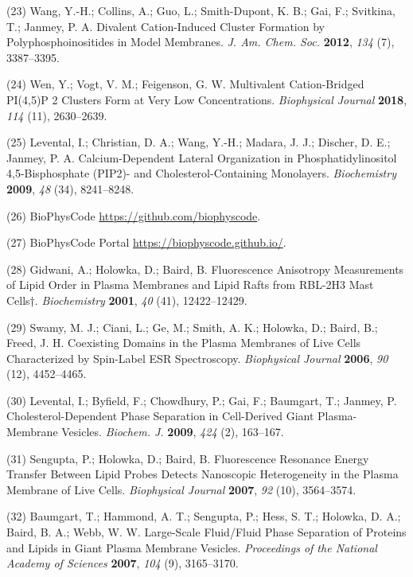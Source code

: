 \documentclass[11pt,notitlepage]{article}
\begin{document}
\leavevmode\hypertarget{ref-LhOwGz4k}{}%
(23) Wang, Y.-H.; Collins, A.; Guo, L.; Smith-Dupont, K. B.; Gai, F.;
Svitkina, T.; Janmey, P. A. Divalent Cation-Induced Cluster Formation by
Polyphosphoinositides in Model Membranes. \emph{J. Am. Chem. Soc.}
\textbf{2012}, \emph{134} (7), 3387--3395.

\leavevmode\hypertarget{ref-ior8wlwH}{}%
(24) Wen, Y.; Vogt, V. M.; Feigenson, G. W. Multivalent Cation-Bridged
PI(4,5)P 2 Clusters Form at Very Low Concentrations. \emph{Biophysical
Journal} \textbf{2018}, \emph{114} (11), 2630--2639.

\leavevmode\hypertarget{ref-JWXdIfNt}{}%
(25) Levental, I.; Christian, D. A.; Wang, Y.-H.; Madara, J. J.;
Discher, D. E.; Janmey, P. A. Calcium-Dependent Lateral Organization in
Phosphatidylinositol 4,5-Bisphosphate (PIP2)- and Cholesterol-Containing
Monolayers. \emph{Biochemistry} \textbf{2009}, \emph{48} (34),
8241--8248.

\leavevmode\hypertarget{ref-14RTQvTQS}{}%
(26) BioPhysCode \url{https://github.com/biophyscode}.

\leavevmode\hypertarget{ref-aHkuGDrS}{}%
(27) BioPhysCode Portal \url{https://biophyscode.github.io/}.

\leavevmode\hypertarget{ref-GGtK2c0N}{}%
(28) Gidwani, A.; Holowka, D.; Baird, B. Fluorescence Anisotropy
Measurements of Lipid Order in Plasma Membranes and Lipid Rafts from
RBL-2H3 Mast Cells†. \emph{Biochemistry} \textbf{2001}, \emph{40} (41),
12422--12429.

\leavevmode\hypertarget{ref-1Eg1Hzju1}{}%
(29) Swamy, M. J.; Ciani, L.; Ge, M.; Smith, A. K.; Holowka, D.; Baird,
B.; Freed, J. H. Coexisting Domains in the Plasma Membranes of Live
Cells Characterized by Spin-Label ESR Spectroscopy. \emph{Biophysical
Journal} \textbf{2006}, \emph{90} (12), 4452--4465.

\leavevmode\hypertarget{ref-oBaB5Z87}{}%
(30) Levental, I.; Byfield, F.; Chowdhury, P.; Gai, F.; Baumgart, T.;
Janmey, P. Cholesterol-Dependent Phase Separation in Cell-Derived Giant
Plasma-Membrane Vesicles. \emph{Biochem. J.} \textbf{2009}, \emph{424}
(2), 163--167.

\leavevmode\hypertarget{ref-BzP79Vj9}{}%
(31) Sengupta, P.; Holowka, D.; Baird, B. Fluorescence Resonance Energy
Transfer Between Lipid Probes Detects Nanoscopic Heterogeneity in the
Plasma Membrane of Live Cells. \emph{Biophysical Journal} \textbf{2007},
\emph{92} (10), 3564--3574.

\leavevmode\hypertarget{ref-aiu6Tmil}{}%
(32) Baumgart, T.; Hammond, A. T.; Sengupta, P.; Hess, S. T.; Holowka,
D. A.; Baird, B. A.; Webb, W. W. Large-Scale Fluid/Fluid Phase
Separation of Proteins and Lipids in Giant Plasma Membrane Vesicles.
\emph{Proceedings of the National Academy of Sciences} \textbf{2007},
\emph{104} (9), 3165--3170.
\end{document}
